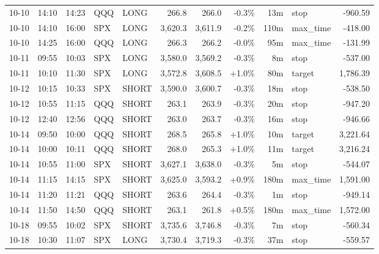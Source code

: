 \documentclass[11pt,a4paper,twoside]{article}
\begin{document}
\begin{center}
\begin{longtable}{>{\color{txtmain}}l l l l l r r r r >{\color{txtmain}}l r}
10-10 & 14:10 & 14:23 & QQQ & LONG & 266.8 & 266.0 & \textcolor{lossred}{-0.3\%} & 13m & stop & \textcolor{lossred}{-960.59} \\
10-10 & 14:10 & 16:00 & SPX & LONG & 3,620.3 & 3,611.9 & \textcolor{lossred}{-0.2\%} & 110m & max\_time & \textcolor{lossred}{-418.00} \\
10-10 & 14:25 & 16:00 & QQQ & LONG & 266.3 & 266.2 & \textcolor{lossred}{-0.0\%} & 95m & max\_time & \textcolor{lossred}{-131.99} \\
10-11 & 09:55 & 10:03 & SPX & LONG & 3,580.0 & 3,569.2 & \textcolor{lossred}{-0.3\%} & 8m & stop & \textcolor{lossred}{-537.00} \\
10-11 & 10:10 & 11:30 & SPX & LONG & 3,572.8 & 3,608.5 & \textcolor{wingreen}{+1.0\%} & 80m & target & \textcolor{wingreen}{1,786.39} \\
10-12 & 10:15 & 10:33 & SPX & SHORT & 3,590.0 & 3,600.7 & \textcolor{lossred}{-0.3\%} & 18m & stop & \textcolor{lossred}{-538.50} \\
10-12 & 10:55 & 11:15 & QQQ & SHORT & 263.1 & 263.9 & \textcolor{lossred}{-0.3\%} & 20m & stop & \textcolor{lossred}{-947.20} \\
10-12 & 12:40 & 12:56 & QQQ & SHORT & 263.0 & 263.7 & \textcolor{lossred}{-0.3\%} & 16m & stop & \textcolor{lossred}{-946.66} \\
10-14 & 09:50 & 10:00 & QQQ & SHORT & 268.5 & 265.8 & \textcolor{wingreen}{+1.0\%} & 10m & target & \textcolor{wingreen}{3,221.64} \\
10-14 & 10:00 & 10:11 & QQQ & SHORT & 268.0 & 265.3 & \textcolor{wingreen}{+1.0\%} & 11m & target & \textcolor{wingreen}{3,216.24} \\
10-14 & 10:55 & 11:00 & SPX & SHORT & 3,627.1 & 3,638.0 & \textcolor{lossred}{-0.3\%} & 5m & stop & \textcolor{lossred}{-544.07} \\
10-14 & 11:15 & 14:15 & SPX & SHORT & 3,625.0 & 3,593.2 & \textcolor{wingreen}{+0.9\%} & 180m & max\_time & \textcolor{wingreen}{1,591.00} \\
10-14 & 11:20 & 11:21 & QQQ & SHORT & 263.6 & 264.4 & \textcolor{lossred}{-0.3\%} & 1m & stop & \textcolor{lossred}{-949.14} \\
10-14 & 11:50 & 14:50 & QQQ & SHORT & 263.1 & 261.8 & \textcolor{wingreen}{+0.5\%} & 180m & max\_time & \textcolor{wingreen}{1,572.00} \\
10-18 & 09:55 & 10:02 & SPX & SHORT & 3,735.6 & 3,746.8 & \textcolor{lossred}{-0.3\%} & 7m & stop & \textcolor{lossred}{-560.34} \\
10-18 & 10:30 & 11:07 & SPX & LONG & 3,730.4 & 3,719.3 & \textcolor{lossred}{-0.3\%} & 37m & stop & \textcolor{lossred}{-559.57} \\

\end{longtable}
\end{center}
\end{document}
